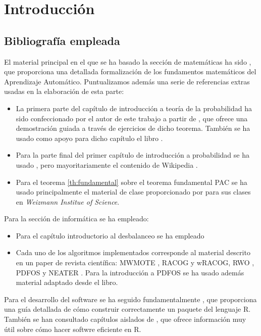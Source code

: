 \chapter*{Introducción}

  \section*{Bibliografía empleada}
  El material principal en el que se ha basado la sección de matemáticas ha sido \citeauthor{shalev}, 
  que proporciona una detallada formalización de los fundamentos matemáticos del Aprendizaje Automático. Puntualizamos además
  una serie de referencias extras usadas en la elaboración de esta parte:
  
  \begin{itemize} 
   \item La primera parte del capítulo de introducción a teoría de la probabilidad ha sido confeccionado por el autor de 
   este trabajo a partir de \citet{caratheodory}, que ofrece una demostración guiada a través de ejercicios de dicho teorema. 
   También se ha usado como apoyo para dicho capítulo el libro \citeauthor{loeve}. 
   \item Para la parte final del primer capítulo de introducción a probabilidad se ha usado \citeauthor{shalev}, pero
   mayoritariamente el contenido de Wikipedia \citep{wiki:markov, wiki:hoeff_lemma, wiki:hoeffding}.
   \item Para el teorema \ref{th:fundamental} sobre el teorema fundamental PAC se ha usado principalmente el material de clase
   proporcionado por \citeauthor{slfetaya} para sus clases en \textit{Weizmann Institue of Science}.
  \end{itemize}
   
   Para la sección de informática se ha empleado:
   
  \begin{itemize}
   \item Para el capítulo introductorio al desbalanceo se ha empleado \citep{he2009} 
   \item Cada uno de los algoritmos implementados corresponde al material descrito en un paper de revista científica: 
   MWMOTE \citep{chawla02}, RACOG y wRACOG\citep{das2015}, RWO \citep{zhang2014}, PDFOS \citep{gao2014} y 
   NEATER \citep{almogahed2014}. Para la introducción a PDFOS se ha usado además material adaptado desde el libro\citeauthor{silverman}.
  \end{itemize}

   Para el desarrollo del software se ha seguido fundamentalmente \citep*{rhadleypkg}, que proporciona una guía detallada de
   cómo construir correctamente un paquete del lenguaje R. También se han consultado capítulos aislados de \citep*{rgillespie},
   que ofrece información muy útil sobre cómo hacer softwre eficiente en R.
